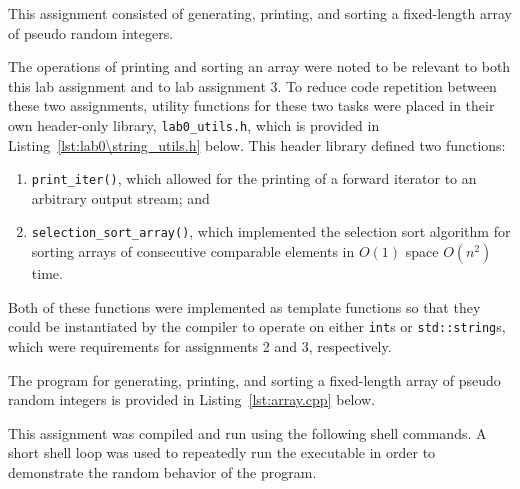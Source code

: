 \documentclass[11pt, letterpaper]{article} %
\begin{document}
This assignment consisted of generating, printing, and sorting a fixed-length array of pseudo random integers. 

The operations of printing and sorting an array were noted to be relevant to both this lab assignment and to lab assignment 3. To reduce code repetition between these two assignments, utility functions for these two tasks were placed in their own header-only library, \texttt{lab0\string_utils.h}, which is provided in Listing~\ref{lst:lab0\string_utils.h} below. This header library defined two functions:
\begin{enumerate}
    \item \texttt{print\string_iter()}, which allowed for the printing of a forward iterator \cite{cplusplus-header-iterator,cppreference-forward-iterator} to an arbitrary output stream; and
    \item \texttt{selection\string_sort\string_array()}, which implemented the selection sort algorithm \cite{wiki:selection-sort} for sorting arrays of consecutive comparable elements in $O(1)$ space $O(n^2)$ time.
\end{enumerate}
Both of these functions were implemented as template functions so that they could be instantiated by the compiler to operate on either \texttt{int}s or \texttt{std::string}s, which were requirements for assignments 2 and 3, respectively.


The program for generating, printing, and sorting a fixed-length array of pseudo random integers is provided in Listing~\ref{lst:array.cpp} below.



This assignment was compiled and run using the following shell commands. A short shell loop was used to repeatedly run the executable in order to demonstrate the random behavior of the program.
\end{document}
